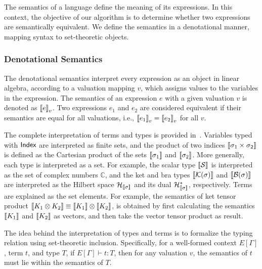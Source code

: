 The semantics of a language define the meaning of its expressions. In this context, the objective of our algorithm is to determine whether two expressions are semantically equivalent. We define the semantics in a denotational manner, mapping syntax to set-theoretic objects.

\subsubsection{Denotational Semantics}
The denotational semantics interpret every expression as an object in linear algebra, according to a valuation mapping \( v \), which assigns values to the variables in the expression. The semantics of an expression \( e \) with a given valuation \( v \) is denoted as \( {\llbracket e \rrbracket}_v \). Two expressions \( e_1 \) and \( e_2 \) are considered equivalent if their semantics are equal for all valuations, i.e., \( {\llbracket e_1 \rrbracket}_v = {\llbracket e_2 \rrbracket}_v \) for all \( v \).

The complete interpretation of terms and types is provided in~. Variables typed with \( \mathsf{Index} \) are interpreted as finite sets, and the product of two indices \( {\llbracket \sigma_1 \times \sigma_2 \rrbracket} \) is defined as the Cartesian product of the sets \( {\llbracket \sigma_1 \rrbracket} \) and \( {\llbracket \sigma_2 \rrbracket} \). More generally, each type is interpreted as a set. For example, the scalar type \( {\llbracket \mathcal{S} \rrbracket} \) is interpreted as the set of complex numbers \( \mathbb{C} \), and the ket and bra types \( {\llbracket \mathcal{K}(\sigma) \rrbracket} \) and \( {\llbracket \mathcal{B}(\sigma) \rrbracket} \) are interpreted as the Hilbert space \( \mathcal{H}_{{\llbracket \sigma \rrbracket}} \) and its dual \( \mathcal{H}_{{\llbracket \sigma \rrbracket}}^* \), respectively. Terms are explained as the set elements. For example, the semantics of ket tensor product ${\llbracket K_1 \otimes K_2 \rrbracket} \equiv {\llbracket K_1 \rrbracket} \otimes {\llbracket K_2 \rrbracket}$, is obtained by first calculating the semantics ${\llbracket K_1 \rrbracket}$ and ${\llbracket K_2 \rrbracket}$ as vectors, and then take the vector tensor product as result.


The idea behind the interpretation of types and terms is to formalize the typing relation using set-theoretic inclusion. Specifically, for a well-formed context \( E[\Gamma] \), term \( t \), and type \( T \), if \( E[\Gamma] \vdash t : T \), then for any valuation \( v \), the semantics of \( t \) must lie within the semantics of \( T \).

